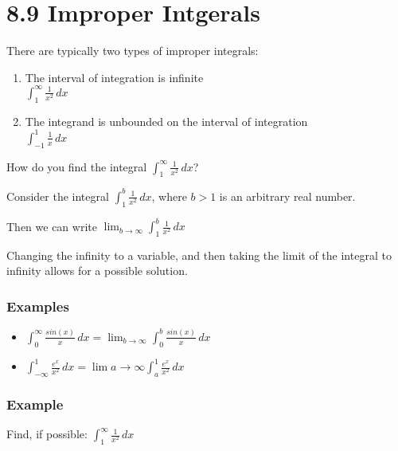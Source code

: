 \documentclass[12pt]{article}
\begin{document}
\section*{8.9 Improper Intgerals}

There are typically two types of improper integrals:

\begin{enumerate}

    \item The interval of integration is infinite \\
    $ \int_{1}^{\infty} \frac{1}{x^2} \,dx $

    \item The integrand is unbounded on the interval of integration \\
    $ \int_{-1}^{1} \frac{1}{x} \,dx $

\end{enumerate}

How do you find the integral $\int_{1}^{\infty} \frac{1}{x^2} \,dx$?

Consider the integral $\int_{1}^{b} \frac{1}{x^2} \,dx$, where $b > 1$ is an arbitrary real number.

Then we can write $\lim_{b\to\infty} \int_{1}^{b} \frac{1}{x^2} \,dx $

Changing the infinity to a variable, and then taking the limit of the integral to infinity allows for a possible solution.

\subsubsection*{Examples}

\begin{itemize}

    \item $ \int_{0}^{\infty} \frac{sin(x)}{x} \,dx = \lim_{b\to\infty} \int_{0}^{b} \frac{sin(x)}{x} \,dx $

    \item $ \int_{-\infty}^{1} \frac{e^x}{x^2} \,dx = \lim{a\to\infty} \int_{a}^{1} \frac{e^x}{x^2} \,dx $

\end{itemize}


\subsubsection*{Example}

Find, if possible: $ \int_{1}^{\infty} \frac{1}{x^2} \,dx $
\end{document}
